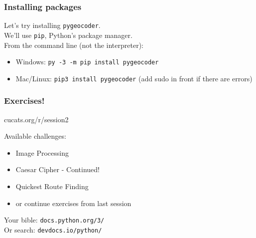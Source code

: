 \documentclass[presentation]{beamer}
\begin{document}
	\begin{frame}[fragile]
		\frametitle{Installing packages}
		Let's try installing \colorbox{codebg}{\lstinline|pygeocoder|}.\\
		\vspace{10pt}
		We'll use \colorbox{codebg}{\lstinline|pip|}, Python's package manager.\\
		\vspace{10pt}
		From the command line (not the interpreter):
		\begin{itemize}
			\item Windows: \colorbox{codebg}{\lstinline|py -3 -m pip install pygeocoder|}
			\item Mac/Linux: \colorbox{codebg}{\lstinline|pip3 install pygeocoder|} (add sudo in front if there are errors)
		\end{itemize}
	\end{frame}

	\begin{frame}[fragile]
		\frametitle{Exercises!}
		\vfill
		\centerline{\LARGE cucats.org/r/session2}
		\vfill
		Available challenges:
		\begin{itemize}
			\item Image Processing
			\item Caesar Cipher - Continued!
			\item Quickest Route Finding
			\item or continue exercises from last session
		\end{itemize}
		\vspace{10pt}
		Your bible: \lstinline|docs.python.org/3/|\\
		Or search: \lstinline|devdocs.io/python/|
	\end{frame}
\end{document}

